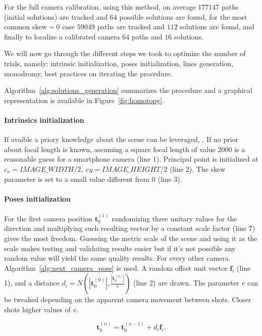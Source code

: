 For the full camera calibration, using this method, on average $177147$ paths (initial solutions) are tracked and $64$ possible solutions are found, for the most common skew$=0$ case $59049$ paths are tracked and $112$ solutions are found, and finally to localize a calibrated camera $64$ paths and $16$ solutions.

We will now go through the different steps we took to optimize the number of trials, namely: intrinsic initialization, poses initialization, lines generation, monodromy, best practices on iterating the procedure.

Algorithm~\ref{alg:solutions_generation} summarizes the procedure and a graphical representation is available in Figure~\ref{fig:homotopy}.

\paragraph{Intrinsics initialization}
If avaible a priory knowledge about the scene can be leveraged, . If no prior about focal length is known, assuming a square focal length of value $2000$ is a reasonable guess for a smartphone camera (line 1). Principal point is initialized at $c_x = IMAGE\_WIDTH / 2, \; cy = IMAGE\_HEIGHT / 2$ (line 2). The skew parameter is set to a small value different from $0$ (line 3).

\paragraph{Poses initialization}
For the first camera position $\mathbf{t}_0^{(1)}$ randomizing three unitary values for the direction and multiplying such resulting vector by a constant scale factor (line 7) gives the most freedom.
Guessing the metric scale of the scene and using it as the scale makes testing and validating results easier but if it's not possible any random value will yield the same quality results.
For every other camera Algorithm~\ref{alg:next_camera_pose} is used. A random offset unit vector $\mathbf{f}_i$ (line 1), and a distance $d_i = N(|\mathbf{t}_0^{(0)}|, \frac{|\mathbf{t}_0^{(0)}|}{v})$ (line 2) are drawn. The parameter $v$ can be tweaked depending on the apparent camera movement between shots. Closer shots higher values of $v$.

\begin{equation}
    \mathbf{t}_0^{(n)} = \mathbf{t}_0^{(n-1)} + d_i\mathbf{f}_i.
\end{equation}

